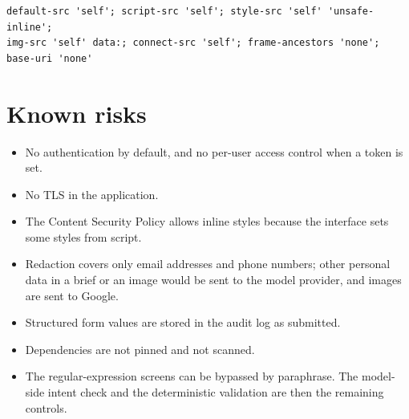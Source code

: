 \begin{lstlisting}[caption={Content Security Policy set by the backend (\texttt{SECURITY\_HEADERS} in \texttt{security.py}).},label={lst:csp}]
default-src 'self'; script-src 'self'; style-src 'self' 'unsafe-inline';
img-src 'self' data:; connect-src 'self'; frame-ancestors 'none'; base-uri 'none'
\end{lstlisting}

\section{Known risks}
\begin{itemize}
  \item No authentication by default, and no per-user access control when a token is set.
  \item No TLS in the application.
  \item The Content Security Policy allows inline styles because the interface sets some styles from script.
  \item Redaction covers only email addresses and phone numbers; other personal data in a brief or an image would be sent to the model provider, and images are sent to Google.
  \item Structured form values are stored in the audit log as submitted.
  \item Dependencies are not pinned and not scanned.
  \item The regular-expression screens can be bypassed by paraphrase. The model-side intent check and the deterministic validation are then the remaining controls.
\end{itemize}
